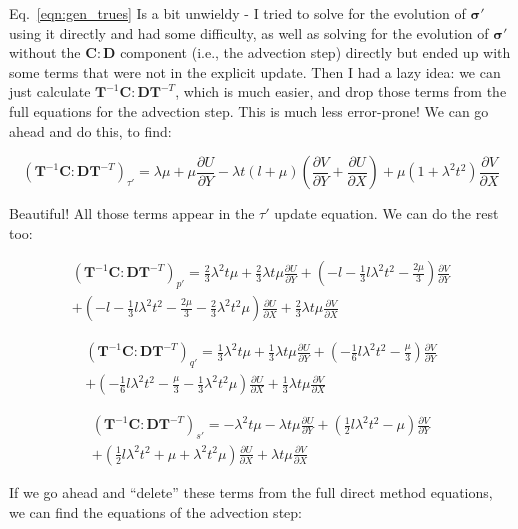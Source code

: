 \documentclass[11pt]{article}
\newcommand{\p}{\partial}
\newcommand{\bsig}{\boldsymbol\sigma}
\newcommand{\bC}{\mathbf{C}}
\newcommand{\bD}{\mathbf{D}}
\newcommand{\bT}{\mathbf{T}}
\newcommand{\dVdX}{\frac{\p V}{\p X}}
\newcommand{\dVdY}{\frac{\p V}{\p Y}}
\newcommand{\dUdX}{\frac{\p U}{\p X}}
\newcommand{\dUdY}{\frac{\p U}{\p Y}}
\begin{document}
Eq.~\ref{eqn:gen_trues} Is a bit unwieldy - I tried to solve for the evolution of $\bsig'$ using it directly and had some difficulty, as well as solving for the evolution of $\bsig'$ without the $\bC:\bD$ component (i.e., the advection step) directly but ended up with some terms that were not in the explicit update. Then I had a lazy idea: we can just calculate $\bT^{-1}\bC:\bD\bT^{-T}$, which is much easier, and drop those terms from the full equations for the advection step. This is much less error-prone! We can go ahead and do this, to find:

\begin{equation}
    \left(\bT^{-1}\bC:\bD\bT^{-T}\right)_{ \tau' } = \lambda\mu + \mu \dUdY - \lambda t (l + \mu)\left(\dVdY + \dUdX\right) + \mu\left(1 + \lambda^2 t^2\right)\dVdX
    \label{eqn:tau'_sub}
\end{equation}

Beautiful! All those terms appear in the $\tau'$ update equation. We can do the rest too:

\begin{multline}
    \left(\bT^{-1}\bC:\bD\bT^{-T}\right)_{ p' } = \frac{2}{3}\lambda^2t\mu + \frac{2}{3}\lambda t \mu \dUdY + \left(-l -\frac{1}{3}l\lambda^2t^2 - \frac{2\mu}{3}\right)\dVdY \\+ \left(-l - \frac{1}{3}l\lambda^2t^2 - \frac{2\mu}{3} - \frac{2}{3}\lambda^2t^2\mu\right)\dUdX + \frac{2}{3}\lambda t\mu \dVdX
    \label{eqn:p'_sub}
\end{multline}

\begin{multline}
    \left(\bT^{-1}\bC:\bD\bT^{-T}\right)_{ q' } = \frac{1}{3}\lambda^2 t\mu + \frac{1}{3}\lambda t \mu \dUdY + \left(-\frac{1}{6}l\lambda^2 t^2 - \frac{\mu}{3}\right)\dVdY \\+ \left(-\frac{1}{6}l\lambda^2 t^2 - \frac{\mu}{3} - \frac{1}{3}\lambda^2t^2\mu\right)\dUdX + \frac{1}{3}\lambda t\mu\dVdX
    \label{eqn:q'_sub}
\end{multline}

\begin{multline}
    \left(\bT^{-1}\bC:\bD\bT^{-T}\right)_{ s' } = -\lambda^2 t \mu - \lambda t \mu \dUdY + \left(\frac{1}{2}l\lambda^2t^2 - \mu\right)\dVdY \\+ \left(\frac{1}{2}l\lambda^2t^2 + \mu + \lambda^2t^2\mu\right)\dUdX + \lambda t\mu\dVdX
    \label{eqn:s'_sub}
\end{multline}

If we go ahead and ``delete'' these terms from the full direct method equations, we can find the equations of the advection step:
\end{document}

